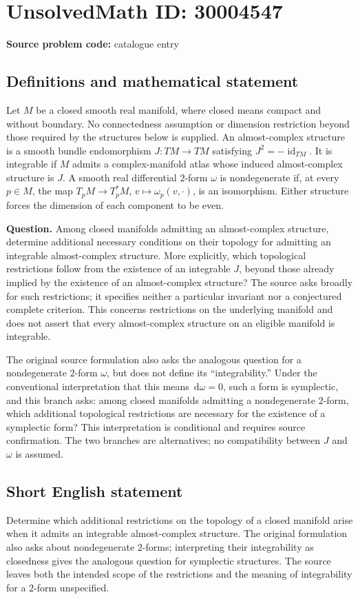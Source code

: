 \documentclass[11pt]{article}
\newcommand{\dd}{\,\mathrm{d}}
\begin{document}
\section*{UnsolvedMath ID: 30004547}
\textbf{Source problem code:} catalogue entry
\subsection{Definitions and mathematical statement}
Let \(M\) be a closed smooth real manifold, where closed means compact and without boundary. No connectedness assumption or dimension restriction beyond those required by the structures below is supplied. An almost-complex structure is a smooth bundle endomorphism \(J:TM\to TM\) satisfying \(J^2=-\operatorname{id}_{TM}\). It is integrable if \(M\) admits a complex-manifold atlas whose induced almost-complex structure is \(J\). A smooth real differential \(2\)-form \(\omega\) is nondegenerate if, at every \(p\in M\), the map \(T_pM\to T_p^*M\), \(v\mapsto\omega_p(v,\cdot)\), is an isomorphism. Either structure forces the dimension of each component to be even.

\textbf{Question.} Among closed manifolds admitting an almost-complex structure, determine additional necessary conditions on their topology for admitting an integrable almost-complex structure. More explicitly, which topological restrictions follow from the existence of an integrable \(J\), beyond those already implied by the existence of an almost-complex structure? The source asks broadly for such restrictions; it specifies neither a particular invariant nor a conjectured complete criterion. This concerns restrictions on the underlying manifold and does not assert that every almost-complex structure on an eligible manifold is integrable.

The original source formulation also asks the analogous question for a nondegenerate \(2\)-form \(\omega\), but does not define its ``integrability.'' Under the conventional interpretation that this means \(\dd\omega=0\), such a form is symplectic, and this branch asks: among closed manifolds admitting a nondegenerate \(2\)-form, which additional topological restrictions are necessary for the existence of a symplectic form? This interpretation is conditional and requires source confirmation. The two branches are alternatives; no compatibility between \(J\) and \(\omega\) is assumed.
\subsection{Short English statement}
Determine which additional restrictions on the topology of a closed manifold arise when it admits an integrable almost-complex structure. The original formulation also asks about nondegenerate \(2\)-forms; interpreting their integrability as closedness gives the analogous question for symplectic structures. The source leaves both the intended scope of the restrictions and the meaning of integrability for a \(2\)-form unspecified.
\end{document}
